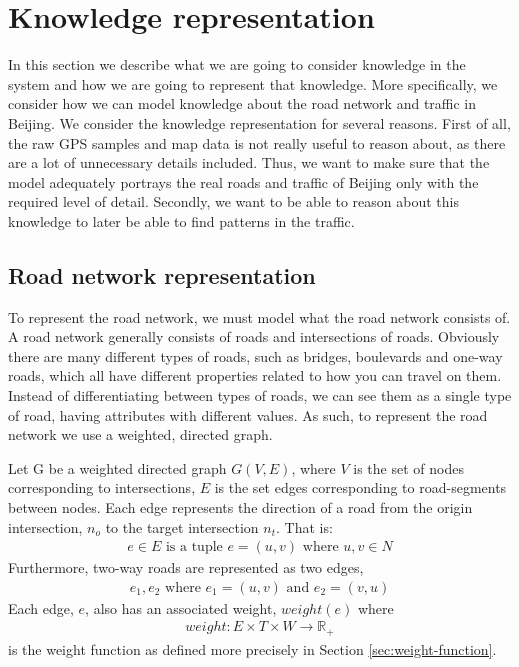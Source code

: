 \section{Knowledge representation}
In this section we describe what we are going to consider knowledge in the system and how we are going to represent that knowledge. More specifically, we consider how we can model knowledge about the road network and traffic in Beijing. We consider the knowledge representation for several reasons. First of all, the raw GPS samples and map data is not really useful to reason about, as there are a lot of unnecessary details included. Thus, we want to make sure that the model adequately portrays the real roads and traffic of Beijing only with the required level of detail. Secondly, we want to be able to reason about this knowledge to later be able to find patterns in the traffic.

\subsection{Road network representation}\label{sec:road-network-rep}
To represent the road network, we must model what the road network consists of. A road network generally consists of roads and intersections of roads. Obviously there are many different types of roads, such as bridges, boulevards and one-way roads, which all have different properties related to how you can travel on them. Instead of differentiating between types of roads, we can see them as a single type of road, having attributes with different values. As such, to represent the road network we use a weighted, directed graph.

Let G be a weighted directed graph $G(V,E)$, where $V$ is the set of nodes corresponding to intersections, $E$ is the set edges corresponding to road-segments between nodes. Each edge represents the direction of a road from the origin intersection, $n_o$ to the target intersection $n_t$. That is:
\begin{align*}
  e \in E \text{ is a tuple } e=(u, v) \text{ where } u, v \in N
\end{align*}
Furthermore, two-way roads are represented as two edges,
\begin{align*}
  e_1, e_2 \text{ where } e_1 = (u, v) \text{ and } e_2=(v, u)
\end{align*}
Each edge, $e$, also has an associated weight, $weight(e)$ where
\begin{align}
weight: E \times T \times W \rightarrow \mathbb R_+
\end{align}
 is the weight function as defined more precisely in Section \ref{sec:weight-function}. 


